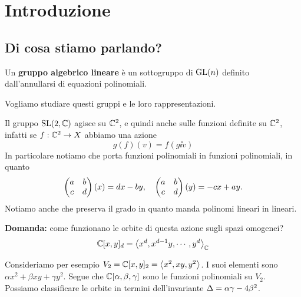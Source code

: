 \chapter*{Introduzione}

\section*{Di cosa stiamo parlando?}
Un \textbf{gruppo algebrico lineare} \`e un sottogruppo di $\mathrm{GL}(n)$ definito dall'annullarsi di equazioni polinomiali.

Vogliamo studiare questi gruppi e le loro rappresentazioni.


\begin{example}
Il gruppo $\mathrm{SL}(2,\mathbb{C})$ agisce su $\mathbb{C}^2$, e quindi anche sulle funzioni definite su $\mathbb{C}^2$, infatti se $f:\mathbb{C}^2\to X$ abbiamo una azione
\[g(f)(v)=f(g\ii v)\]
In particolare notiamo che porta funzioni polinomiali in funzioni polinomiali, in quanto
\[\begin{pmatrix}a&b\\c&d\end{pmatrix}(x)=dx-by,\quad\begin{pmatrix}a&b\\c&d\end{pmatrix}(y)=-cx+ay.\]
Notiamo anche che preserva il grado in quanto manda polinomi lineari in lineari.

\textbf{Domanda:} come funzionano le orbite di questa azione sugli spazi omogenei?
\[\mathbb{C}[x,y]_d=\left\langle {x^d,x^{d-1}y,\cdots,y^d}\right\rangle_{\mathbb{C}}\]

Consideriamo per esempio $V_2=\mathbb{C}[x,y]_2=\left\langle {x^2,xy,y^2}\right\rangle$. I suoi elementi sono $\alpha x^2+\beta xy+\gamma y^2$. Segue che $\mathbb{C}[\alpha,\beta,\gamma]$ sono le funzioni polinomiali su $V_2$. Possiamo classificare le orbite in termini dell'invariante $\Delta=\alpha\gamma-4\beta^2$.
\end{example}